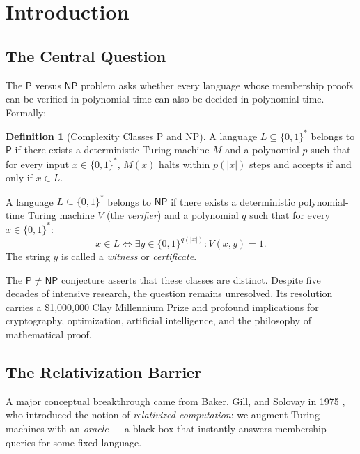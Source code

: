 \documentclass[11pt,a4paper]{article}
\theoremstyle{plain}
\theoremstyle{definition}
\newtheorem{definition}[theorem]{Definition}
\theoremstyle{remark}
\newcommand{\PP}{\mathsf{P}}
\newcommand{\NP}{\mathsf{NP}}
\newcommand{\bits}{\{0,1\}}
\newcommand{\bitsstar}{\{0,1\}^*}
\begin{document}
\vspace{8pt}
{\small\tableofcontents}
\newpage

\section{Introduction}

\subsection{The Central Question}

The $\PP$ versus $\NP$ problem asks whether every language whose membership
proofs can be verified in polynomial time can also be decided in polynomial
time.  Formally:

\begin{definition}[Complexity Classes P and NP]
A language $L \subseteq \bitsstar$ belongs to $\PP$ if there exists a
deterministic Turing machine $M$ and a polynomial $p$ such that for every input
$x \in \bitsstar$, $M(x)$ halts within $p(|x|)$ steps and accepts if and only if
$x \in L$.

A language $L \subseteq \bitsstar$ belongs to $\NP$ if there exists a
deterministic polynomial-time Turing machine $V$ (the \emph{verifier}) and a
polynomial $q$ such that for every $x \in \bitsstar$:
\[
    x \in L \iff \exists y \in \bits^{q(|x|)} : V(x, y) = 1.
\]
The string $y$ is called a \emph{witness} or \emph{certificate}.
\end{definition}

The $\PP \neq \NP$ conjecture asserts that these classes are distinct.  Despite
five decades of intensive research, the question remains unresolved.  Its
resolution carries a \$1,000,000 Clay Millennium Prize and profound implications
for cryptography, optimization, artificial intelligence, and the philosophy of
mathematical proof.

\subsection{The Relativization Barrier}

A major conceptual breakthrough came from Baker, Gill, and Solovay in 1975
\cite{BGS75}, who introduced the notion of \emph{relativized computation}: we
augment Turing machines with an \emph{oracle} — a black box that instantly
answers membership queries for some fixed language.
\end{document}
